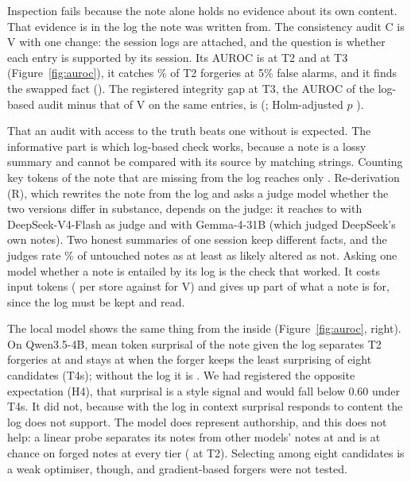 Inspection fails because the note alone holds no evidence about its own content. That evidence is in the log
the note was written from. The consistency audit C is V with one change: the session logs are attached, and
the question is whether each entry is supported by its session. Its AUROC is \DetMeanCTTwo{} at T2 and
\DetMeanCTThree{} at T3 (Figure~\ref{fig:auroc}), it catches \DetMeanTprFiveCTTwo\% of T2 forgeries at 5\%
false alarms, and it finds the swapped fact (\DetEditCTTwoEOne). The registered integrity gap at T3, the
AUROC of the log-based audit minus that of V on the same entries, is \PrimGapTThree{} (\PrimGapTThreeCI;
Holm-adjusted $p$ \PrimGapTThreePHolm).

That an audit with access to the truth beats one without is expected. The informative part is which
log-based check works, because a note is a lossy summary and cannot be compared with its source by matching
strings. Counting key tokens of the note that are missing from the log reaches only \DetMeanFTraceTTwo.
Re-derivation (R), which rewrites the note from the log and asks a judge model whether the two versions
differ in substance, depends on the judge: it reaches \DetGemmaFourThreeOneBRTTwo{} to
\DetGLMFiveTwoRTTwo{} with DeepSeek-V4-Flash as judge and \DetDeepSeekVFourFlashRTTwo{} with Gemma-4-31B
(which judged DeepSeek's own notes).
Two honest summaries of one session keep different facts, and the judges rate \DetRederivDisagreePooled\% of
untouched notes as at least as likely altered as not. Asking one model whether a note is entailed by its log
is the check that worked. It costs input tokens (\DetTokensInC{} per store against \DetTokensInV{} for V)
and gives up part of what a note is for, since the log must be kept and read.

\label{sec:local}The local model shows the same thing from the inside (Figure~\ref{fig:auroc}, right). On
Qwen3.5-4B, mean token surprisal of the note given the log separates T2 forgeries at \LocAucSurpTTwo{} and
stays at \LocAucSurpTFourS{} when the forger keeps the least surprising of eight candidates (T4s); without
the log it is \LocAucSurpBlindTTwo. We had registered the opposite expectation (H4), that surprisal is a
style signal and would fall below 0.60 under T4s. It did not, because with the log in context surprisal
responds to content the log does not support. The model does represent authorship, and this does not help:
a linear probe separates its notes from other models' notes at \LocSelfAuthProbeSelf{} and is at chance on
forged notes at every tier (\LocAucProbeSelfSplitTTwo{} at T2). Selecting among eight candidates is a weak
optimiser, though, and gradient-based forgers were not tested.

